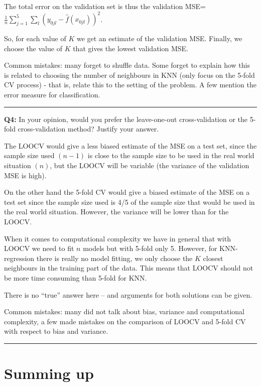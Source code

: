 \documentclass[]{article}
\begin{document}
The total error on the validation set is thus the validation
MSE=\(\frac{1}{n}\sum_{j=1}^5 \sum_{l}(y_{0jl}-\hat{f}(x_{0jl}))^2\).

So, for each value of \(K\) we get an estimate of the validation MSE.
Finally, we choose the value of \(K\) that gives the lowest validation
MSE.

Common mistakes: many forget to shuffle data. Some forget to explain how
this is related to choosing the number of neighbours in KNN (only focus
on the 5-fold CV process) - that is, relate this to the setting of the
problem. A few mention the error measure for classification.

\begin{center}\rule{0.5\linewidth}{\linethickness}\end{center}

\textbf{Q4:} In your opinion, would you prefer the leave-one-out
cross-validation or the 5-fold cross-validation method? Justify your
answer.

The LOOCV would give a less biased estimate of the MSE on a test set,
since the sample size used \((n-1)\) is close to the sample size to be
used in the real world situation \((n)\), but the LOOCV will be variable
(the variance of the validation MSE is high).

On the other hand the 5-fold CV would give a biased estimate of the MSE
on a test set since the sample size used is 4/5 of the sample size that
would be used in the real world situation. However, the variance will be
lower than for the LOOCV.

When it comes to computational complexity we have in general that with
LOOCV we need to fit \(n\) models but with 5-fold only 5. However, for
KNN-regression there is really no model fitting, we only choose the
\(K\) closest neighbours in the training part of the data. This means
that LOOCV should not be more time consuming than 5-fold for KNN.

There is no ``true'' answer here -- and arguments for both solutions can
be given.

Common mistakes: many did not talk about bias, variance and
computational complexity, a few made mistakes on the comparison of LOOCV
and 5-fold CV with respect to bias and variance.

\begin{center}\rule{0.5\linewidth}{\linethickness}\end{center}

\section{Summing up}\label{summing-up}
\end{document}
